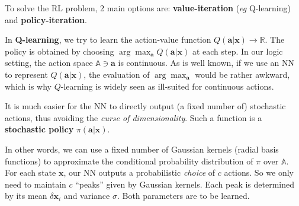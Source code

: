 \documentclass[orivec]{llncs}
\newcommand{\vect}[1]{\boldsymbol{#1}}
\begin{document}
To solve the RL problem, 2 main options are: \textbf{value-iteration} (\textit{eg} Q-learning) and \textbf{policy-iteration}.

In \textbf{Q-learning}, we try to learn the action-value function $Q(\vect{a}|\vect{x}) \rightarrow \mathbb{R}$.  The policy is obtained by choosing $\displaystyle \arg \max_{\vect{a}} Q(\vect{a}|\vect{x})$ at each step.  In our logic setting, the action space $\mathbb{A} \ni \vect{a}$ is continuous.  As is well known, if we use an NN to represent $Q(\vect{a}|\vect{x})$, the evaluation of $\displaystyle \arg \max_{\vect{a}}$ would be rather awkward, which is why $Q$-learning is widely seen as ill-suited for continuous actions.

It is much easier for the NN to directly output (a fixed number of) stochastic actions, thus avoiding the \textit{curse of dimensionality}.  Such a function is a \textbf{stochastic policy} $\pi(\vect{a}|\vect{x})$.



In other words, we can use a fixed number of Gaussian kernels (radial basis functions) to approximate the conditional probability distribution of $\pi$ over $\mathbb{A}$.  
For each state $\vect{x}$, our NN outputs a probabilistic \textit{choice} of $c$ actions.  So we only need to maintain $c$ ``peaks'' given by Gaussian kernels.  Each peak is determined by its mean $\delta \vect{x}_i$ and variance $\sigma$.  Both parameters are to be learned.
\end{document}
